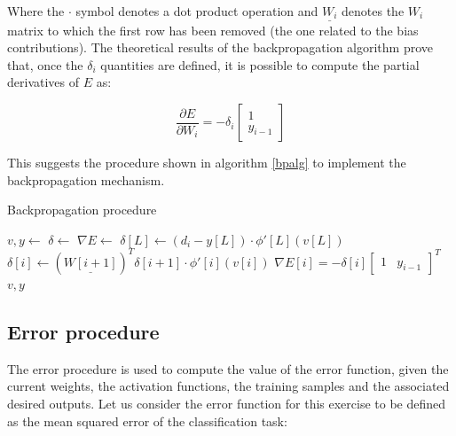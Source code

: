 \documentclass[letterpaper,headings=standardclasses]{scrartcl}
\begin{document}
Where the $\cdot$ symbol denotes a dot product operation and $\underline{W_i}$ denotes the $W_i$ matrix to which the first row has been removed (the one related to the bias contributions). The theoretical results of the backpropagation algorithm prove that, once the $\delta_i$ quantities are defined, it is possible to compute the partial derivatives of $E$ as:

$$ \frac{\partial E}{\partial W_i} = - \delta_i \left[ \begin{matrix} 1 \\ y_{i - 1} \end{matrix} \right] $$

This suggests the procedure shown in algorithm \ref{bpalg} to implement the backpropagation mechanism.

\begin{algorithm}[h]
    \caption{Backpropagation procedure}
    \label{bpalg}
    \begin{algorithmic}
    
        \State {}
        \State $v, y \gets $ 
        \State $\delta \gets $ 
        \State $\nabla E \gets $ 
        \State {}
        \State $\delta[L] \gets (d_i - y[L]) \cdot \phi'[L](v[L])$
            \State $\delta[i] \gets \left( \underline{W[i + 1]} \right)^T \delta[i + 1] \cdot \phi'[i](v[i])$
        \EndFor
        \State {}
            \State $\nabla E[i] = -\delta[i] \left[ \begin{matrix} 1 & y_{i - 1} \end{matrix} \right]^T$
        \EndFor
        \State \Return $v, y$
    \EndFunction
    
    \end{algorithmic}
\end{algorithm}

\subsection{Error procedure}

The error procedure is used to compute the value of the error function, given the current weights, the activation functions, the training samples and the associated desired outputs. Let us consider the error function for this exercise to be defined as the mean squared error of the classification task:
\end{document}
